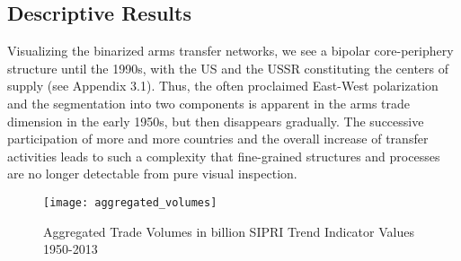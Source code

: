 \documentclass[12pt, letterpaper]{article}
\numberwithin{equation}{section}
\begin{document}
 \subsection{Descriptive Results}
Visualizing the binarized arms transfer networks, we see a bipolar core-periphery structure until the 1990s, with the US and the USSR constituting the centers of supply (see Appendix 3.1). Thus, the often proclaimed East-West polarization and the segmentation into two components is apparent in the arms trade dimension in the early 1950s, but then disappears gradually. The successive participation of more and more countries and the overall increase of transfer activities leads to such a complexity that fine-grained structures and processes are no longer detectable from pure visual inspection. 


\begin{figure}
\begin{center}
\texttt{[image: aggregated\_volumes]}
\caption{Aggregated Trade Volumes in billion SIPRI Trend Indicator Values 1950-2013}
\label{tiv_agg}
\end{center}
\end{figure}
\end{document}
